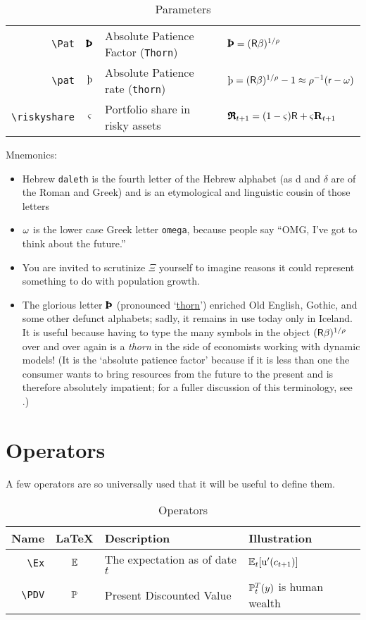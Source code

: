 \documentclass[12pt]{econtex}
\begin{document}
\begin{table}[h]
\begin{tabular}{|>{\ttfamily}rcll|}
  \\ \verb|\Pat|  & $\Pat$ & Absolute Patience Factor (\texttt{Thorn}) & $\Pat = (\Rfree \DiscFac)^{1/\CRRA} $
  \\ \verb|\pat|  & $\pat$ & Absolute Patience rate (\texttt{thorn}) & $\pat = (\Rfree \DiscFac)^{1/\CRRA}-1 \approx \CRRA^{-1}(\rfree-\discRte) $
  \\ \verb|\riskyshare|  & $\varsigma$ & Portfolio share in risky assets & $\pmb{\mathfrak{R}}_{t+1}=(1-\varsigma)\mathsf{R}+\varsigma\mathbf{R}_{t+1}$
  \\	\hline
	\end{tabular}
	\caption{Parameters}
	\label{table:Parameters}
\end{table}	

Mnemonics:
\begin{itemize}
\item Hebrew \texttt{daleth} is the fourth letter of the Hebrew alphabet (as d and $\delta$ are of the Roman and Greek) and is an etymological and linguistic cousin of those letters
\item $\omega$ is the lower case Greek letter \texttt{omega}, because people say ``OMG, I've got to think about the future.''
\item You are invited to scrutinize $\Xi$ yourself to imagine reasons it could represent something to do with population growth.  
\item The glorious letter $\Pat$ (pronounced `\href{http://en.wikipedia.org/wiki/Thorn_(letter)}{thorn}') enriched Old English, Gothic, and some other defunct alphabets; sadly, it remains in use today only in Iceland.  It is useful because having to type the many symbols in the object $(\mathsf{R} \beta)^{1/\rho}$ over and over again is a \textit{thorn} in the side of economists working with dynamic models!  (It is the `absolute patience factor' because if it is less than one the consumer wants to bring resources from the future to the present and is therefore absolutely impatient; for a fuller discussion of this terminology, see \cite{carrollTractable}.)
\end{itemize}



\section{Operators}
A few operators are so universally used that it will be useful to define them.

\begin{table}[h]
	\centering
	\begin{tabular}{|>{\ttfamily}rcll|} 		
		\hline
		 Name    & \LaTeX         & Description & Illustration
  \\ \hline
     \verb|\Ex|        & $\operatorname{\mathbb{E}}$       & The expectation as of date $t$ & $\operatorname{\mathbb{E}}_{t}[{\mathrm{u}}^{\prime}(c_{t+1})]$
\\   \verb|\PDV|        & $\mathbb{P}$       & Present Discounted Value & $\mathbb{P}_{t}^{T}(y)$ is human wealth
  \\	\hline
	\end{tabular}
	\caption{Operators}
	\label{table:Operators}
\end{table}	
\end{document}

